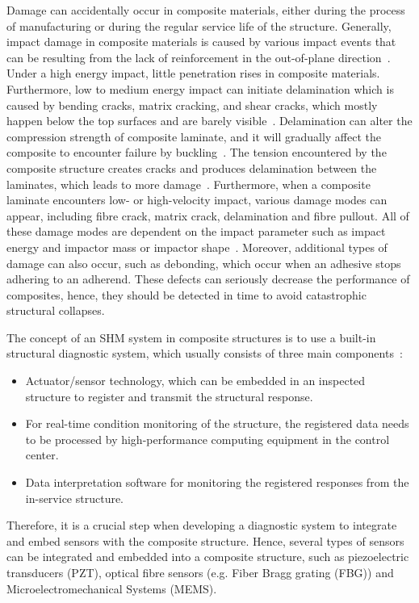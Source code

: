 Damage can accidentally occur in composite materials, either during the process of manufacturing or during the regular service life of the structure. 
Generally, impact damage in composite materials is caused by various impact events that can be resulting from the lack of reinforcement in the out-of-plane direction~\cite{Cai2012}. 
Under a high energy impact, little penetration rises in composite materials.  
Furthermore, low to medium energy impact can initiate delamination which is caused by bending cracks, matrix cracking, and shear cracks,  which mostly happen below the top surfaces and are barely visible~\cite{Cai2012}. 
Delamination can alter the compression strength of composite laminate, and it will gradually affect the composite to encounter failure by buckling~\cite{NurAzrieBtSafri2018}.
The tension encountered by the composite structure creates cracks and produces delamination between the laminates, which leads to more damage~\cite{NurAzrieBtSafri2018}. 
Furthermore, when a composite laminate encounters low- or high-velocity impact, various damage modes can appear, including fibre crack, matrix crack, delamination and fibre pullout. 
All of these damage modes are dependent on the impact parameter such as impact energy and impactor mass or impactor shape~\cite{NurAzrieBtSafri2018}.
Moreover, additional types of damage can also occur, such as debonding, which occur when an adhesive stops adhering to an adherend.
These defects can seriously decrease the performance of composites, hence, they should be detected in time to avoid catastrophic structural collapses.  

The concept of an SHM system in composite structures is to use a built-in structural diagnostic system, which usually consists of three main components~\cite{Hassani2022}: 
\begin{itemize}
	\item Actuator/sensor technology, which can be embedded in an inspected structure to register and transmit the structural response.
	\item For real-time condition monitoring of the structure, the registered data needs to be processed by high-performance computing equipment in the control center.
	\item Data interpretation software for monitoring the registered responses from the in-service structure.
\end{itemize}
Therefore, it is a crucial step when developing a diagnostic system to integrate and embed sensors with the composite structure. 
Hence, several types of sensors can be integrated and embedded into a composite structure, such as piezoelectric transducers (PZT), optical fibre sensors (e.g. Fiber Bragg grating (FBG)) and Microelectromechanical Systems (MEMS).

